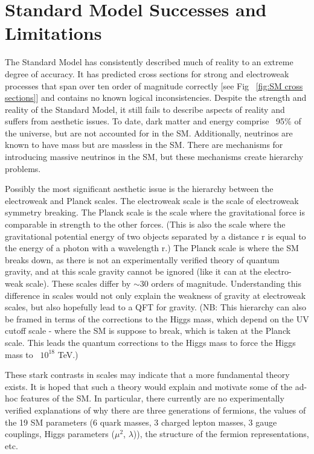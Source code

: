 \section{Standard Model Successes and Limitations}
The Standard Model has consistently described much of reality to an extreme degree of accuracy. It has predicted cross sections for strong and electroweak processes that span over ten order of magnitude correctly [see Fig ~\ref{fig:SM cross sections}] and contains no known logical inconsistencies. Despite the strength and reality of the Standard Model, it still fails to describe aspects of reality and suffers from aesthetic issues. 
To date, dark matter and energy comprise ~95\% of the universe, but are not accounted for in the SM. Additionally, neutrinos are known to have mass but are massless in the SM. There are mechanisms for introducing massive neutrinos in the SM, but these mechanisms create hierarchy problems. 

Possibly the most significant aesthetic issue is the hierarchy between the electroweak and Planck scales. The electroweak scale is the scale of electroweak symmetry breaking. The Planck scale is the scale where the gravitational force is comparable in strength to the other forces. (This is also the scale where the gravitational potential energy of two objects separated by a distance r is equal to the energy of a photon with a wavelength r.) The Planck scale is where the SM breaks down, as there is not an experimentally verified theory of quantum gravity, and at this scale gravity cannot be ignored (like it can at the electro-weak scale). These scales differ by $\sim30$ orders of magnitude. Understanding this difference in scales would not only explain the weakness of gravity at electroweak scales, but also hopefully lead to a QFT for gravity. (NB: This hierarchy can also be framed in terms of the corrections to the Higgs mass, which depend on the UV cutoff scale - where the SM is suppose to break, which is taken at the Planck scale. This leads the quantum corrections to the Higgs mass to force the Higgs mass to ~$10^{18}$ TeV.)

These stark contrasts in scales may indicate that a more fundamental theory exists. It is hoped that such a theory would explain and motivate some of the ad-hoc features of the SM. In particular, there currently are no experimentally verified explanations of why there are three generations of fermions, the values of the 19 SM parameters (6 quark masses, 3 charged lepton masses, 3 gauge couplings, Higgs parameters ($\mu^{2}$, $\lambda$)), the structure of the fermion representations, etc. 


